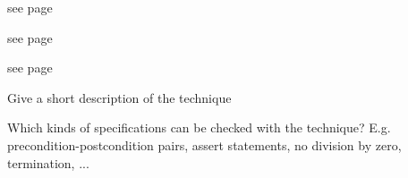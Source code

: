 \documentclass[a4paper]{article}
\begin{document}
\begin{landscape}
\begin{minipage}[t]{0.2\linewidth}
\begin{betterlist}
\begin{betterlist}
		\end{betterlist}
	\end{betterlist}
\end{minipage}
\begin{minipage}[t]{0.2\linewidth}
	\raggedright
 \begin{betterlist}
     \item see page \pageref{pdf:invariant_synthesis}
 \end{betterlist}
\end{minipage}
\begin{minipage}[t]{0.2\linewidth}
	\raggedright
 \begin{betterlist}
     \item see page \pageref{pdf:ranking_function_synthesis}
 \end{betterlist}
\end{minipage}
\newpage
\begin{minipage}[t]{0.2\linewidth}
	\raggedright
 \begin{betterlist}
     \item see page \pageref{pdf:terminator}
 \end{betterlist}
\end{minipage}
\begin{minipage}[t]{0.2\linewidth}
	\raggedright
	\begin{betterlist}
		\item Give a short description of the technique
		\item Which kinds of specifications can be checked with the technique? E.g. precondition-postcondition pairs, assert statements, no division by zero, termination, ...


\end{betterlist}
\end{minipage}
\end{landscape}
\end{document}

